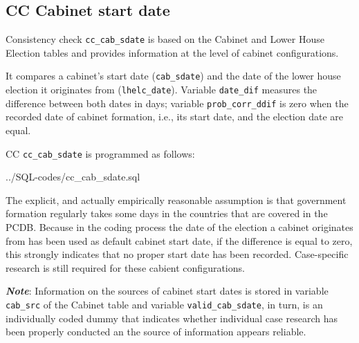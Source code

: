\subsection{CC Cabinet start date}\label{cc_cab_sdate}
Consistency check \texttt{\footnotesize cc\_cab\_sdate} is based on the Cabinet and Lower House Election tables and provides information at the level of cabinet configurations.

It compares a cabinet's start date (\texttt{\footnotesize cab\_sdate}) and the date of the lower house election it originates from (\texttt{\footnotesize lhelc\_date}). Variable \texttt{\footnotesize date\_dif} measures the difference between both dates in days; variable \texttt{\footnotesize prob\_corr\_ddif} is zero when the recorded date of cabinet formation, i.e., its start date, and the election date are equal. 

CC \texttt{\footnotesize cc\_cab\_sdate} is programmed as follows:

%
{../SQL-codes/cc_cab_sdate.sql}


The explicit, and actually empirically reasonable assumption is that government formation regularly takes some days in the countries that are covered in the PCDB. Because in the coding process the date of the election a cabinet originates from has been used as default cabinet start date, if the difference is equal to zero, this strongly indicates that no proper start date has been recorded. Case-specific research is still required for these cabient configurations.

\emph{\textbf{Note}}: Information on the sources of cabinet start dates is stored in variable \texttt{\footnotesize cab\_src} of the Cabinet table and variable \texttt{\footnotesize valid\_cab\_sdate}, in turn, is an individually coded dummy that indicates whether individual case research has been properly conducted an the source of information appears reliable.

